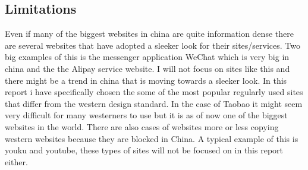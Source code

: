  \subsection{Limitations}
 Even if many of the biggest websites in china are quite information dense there are several websites that have adopted a sleeker look for their sites/services. Two big examples of this is the messenger application WeChat which is very big in china and the the Alipay service website. I will not focus on sites like this and there might be a trend in china that is moving towards a sleeker look. In this report i have specifically chosen the some of the most popular regularly used sites that differ from the western design standard. In the case of Taobao it might seem very difficult for many westerners to use but it is as of now one of the biggest websites in the world. There are also cases of websites more or less copying western websites because they are blocked in China. A typical example of this is youku and youtube, these types of sites will not be focused on in this report either.